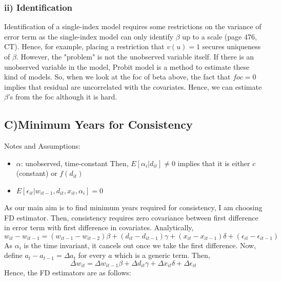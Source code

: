 \documentclass[11pt]{article}
\begin{document}
\subsubsection*{ii) Identification}
Identification of a single-index model requires some restrictions on the variance of error term as the single-index model can only identify $\beta$ up to a scale (page 476, CT). Hence, for example, placing a restriction that $v(u)=1$ secures uniqueness of $\beta$. However, the "problem" is not the unobserved variable itself. If there is an unobserved variable in the model, Probit model is a method to estimate these kind of models. So, when we look at the foc of beta above, the fact that $foc=0$ implies that residual are uncorrelated with the covariates. Hence, we can estimate $\beta$'s from the foc although it is hard.
\subsection*{C)Minimum Years for Consistency}
Notes and Assumptions:
\begin{itemize}
\item $\alpha$: unobserved, time-constant
\subitem Then, $E[\alpha_{i}|d_{it}] \neq 0$ implies that it is either $c$ (constant) or $f(d_{it})$ 
\item $E[\epsilon_{it}| w_{it-1}, d_{it}, x_{it}, \alpha_{i}]=0$
\end{itemize}
As our main aim is to find minimum years required for consistency, I am choosing FD estimator. Then, consistency requires zero covariance between first difference in error term with first difference in covariates. Analytically,
\begin{equation}
w_{it}-w_{it-1} = (w_{it-1}-w_{it-2})\beta + (d_{it}-d_{it-1})\gamma + (x_{it}-x_{it-1})\delta + (\epsilon_{it}-\epsilon_{it-1}) \nonumber
\end{equation}
As $\alpha_{i}$ is the time invariant, it cancels out once we take the first difference. Now, define $a_{t}-a_{t-1}=\Delta a_{t}$ for every $a$ which is a generic term.
Then,
\begin{equation}
\Delta w_{it} = \Delta w_{it-1}\beta + \Delta d_{it}\gamma + \Delta x_{it}\delta+\Delta \epsilon_{it}\nonumber
\end{equation}
Hence, the FD estimators are as follows:
\end{document}
